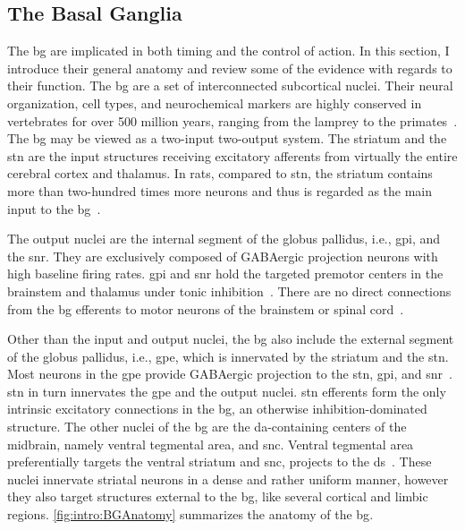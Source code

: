\subsection{The Basal Ganglia}
\label{intro:BGAnatomy}
The \gls{bg} are implicated in both timing and the control of action.
In this section, I introduce their general anatomy and review some of the evidence with regards to their function.
The \gls{bg} are a set of interconnected subcortical nuclei.
Their neural organization, cell types, and neurochemical markers are highly conserved in vertebrates for over 500 million years, ranging from the lamprey to the primates~\cite{Grillner2016BG}.
The \gls{bg} may be viewed as a two-input two-output system.
The striatum and the \gls{stn} are the input structures receiving excitatory afferents from virtually the entire cerebral cortex and thalamus.
In rats, compared to \gls{stn}, the striatum contains more than two-hundred times more neurons and thus is regarded as the main input to the \gls{bg}~\cite{Oorschot1996}.
\par
The output nuclei are the internal segment of the globus pallidus, i.e., \gls{gpi}, and the \gls{snr}.
They are exclusively composed of GABAergic projection neurons with high baseline firing rates.
\Gls{gpi} and \gls{snr} hold the targeted premotor centers in the brainstem and thalamus under tonic inhibition~\cite{Redgrave2010}.
There are no direct connections from the \gls{bg} efferents to motor neurons of the brainstem or spinal cord~\cite{Mink1996}.
\par
Other than the input and output nuclei, the \gls{bg} also include the external segment of the globus pallidus, i.e., \gls{gpe}, which is innervated by the striatum and the \gls{stn}.
Most neurons in the \gls{gpe} provide GABAergic projection to the \gls{stn}, \gls{gpi}, and \gls{snr}~\cite{Dudman2015Book}.
\Gls{stn} in turn innervates the \gls{gpe} and the output nuclei.
\Gls{stn} efferents form the only intrinsic excitatory connections in the \gls{bg}, an otherwise inhibition-dominated structure.
The other nuclei of the \gls{bg} are the \gls{da}-containing centers of the midbrain, namely ventral tegmental area, and \gls{snc}.
Ventral tegmental area preferentially targets the ventral striatum and \gls{snc}, projects to the \gls{ds}~\cite{Cox2019NatRevNeurosci}.
These nuclei innervate striatal neurons in a dense and rather uniform manner, however they also target structures external to the \gls{bg}, like several cortical and limbic regions.
\autoref{fig:intro:BGAnatomy} summarizes the anatomy of the \gls{bg}.


